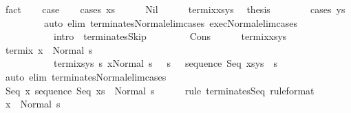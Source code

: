 \begin{isabellebody}
\ fact\isanewline
\ \ \isamarkupfalse%
\ {\isacharquery}case\isanewline
\ \ \isamarkupfalse%
\ {\isacharparenleft}cases\ xs{\isacharparenright}\isanewline
\ \ \ \ \isamarkupfalse%
\ Nil\isanewline
\ \ \ \ \isamarkupfalse%
\ termi{\isacharunderscore}x{\isacharunderscore}xs{\isacharunderscore}ys\ \isamarkupfalse%
\ {\isacharquery}thesis\isanewline
\ \ \ \ \ \ \isamarkupfalse%
\ {\isacharparenleft}cases\ ys{\isacharparenright}\isanewline
\ \ \ \ \ \ \ \ \ {\isacharparenleft}auto\ elim{\isacharcolon}\ terminates{\isacharunderscore}Normal{\isacharunderscore}elim{\isacharunderscore}cases\ exec{\isacharunderscore}Normal{\isacharunderscore}elim{\isacharunderscore}cases\ \isanewline
\ \ \ \ \ \ \ \ \ \ \ intro{\isacharcolon}\ \ terminates{\isacharunderscore}Skip{\isacharprime}{\isacharparenright}\isanewline
\ \ \isamarkupfalse%
\isanewline
\ \ \ \ \isamarkupfalse%
\ Cons\isanewline
\ \ \ \ \isamarkupfalse%
\ termi{\isacharunderscore}x{\isacharunderscore}xs{\isacharunderscore}ys\ \isanewline
\ \ \ \ \isamarkupfalse%
\ termi{\isacharunderscore}x{\isacharcolon}\ {\isachardoublequoteopen}{\isasymGamma}{\isasymturnstile}x\ {\isasymdown}\ Normal\ s{\isachardoublequoteclose}\ \isanewline
\ \ \ \ \ \ \ \ \ \ \ termi{\isacharunderscore}xs{\isacharunderscore}ys{\isacharcolon}\ {\isachardoublequoteopen}{\isasymforall}s{\isacharprime}{\isachardot}\ {\isasymGamma}{\isasymturnstile}{\isasymlangle}x{\isacharcomma}Normal\ s\ {\isasymrangle}\ {\isasymRightarrow}\ s{\isacharprime}\ {\isasymlongrightarrow}\ \ {\isasymGamma}{\isasymturnstile}sequence\ Seq\ {\isacharparenleft}xs{\isacharat}ys{\isacharparenright}\ {\isasymdown}\ s{\isacharprime}{\isachardoublequoteclose}\isanewline
\ \ \ \ \ \ \isamarkupfalse%
\ {\isacharparenleft}auto\ elim{\isacharcolon}\ terminates{\isacharunderscore}Normal{\isacharunderscore}elim{\isacharunderscore}cases{\isacharparenright}\isanewline
\ \ \ \ \isanewline
\ \ \ \ \isamarkupfalse%
\ {\isachardoublequoteopen}{\isasymGamma}{\isasymturnstile}Seq\ x\ {\isacharparenleft}sequence\ Seq\ xs{\isacharparenright}\ {\isasymdown}\ Normal\ s{\isachardoublequoteclose}\isanewline
\ \ \ \ \isamarkupfalse%
\ {\isacharparenleft}rule\ terminates{\isachardot}Seq\ {\isacharbrackleft}rule{\isacharunderscore}format{\isacharbrackright}{\isacharparenright}\isanewline
\ \ \ \ \ \ \isamarkupfalse%
\ {\isachardoublequoteopen}{\isasymGamma}{\isasymturnstile}x\ {\isasymdown}\ Normal\ s{\isachardoublequoteclose}\ \isamarkupfalse%

\end{isabellebody}
